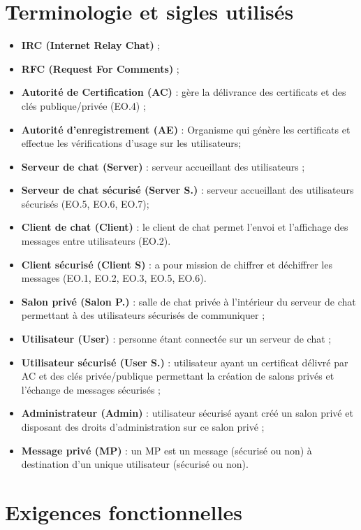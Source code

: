 \documentclass[a4paper,11pt,french]{article}
\begin{document}
\section{Terminologie et sigles utilisés}
\begin{itemize}
\item \textbf{IRC (Internet Relay Chat)} ;
\item \textbf{RFC (Request For Comments)} ;
\item \textbf{Autorité de Certification (AC)} : gère la délivrance des certificats et des clés publique/privée (EO.4) ;
\item \textbf{Autorité d'enregistrement (AE)} : Organisme qui génère les certificats et effectue les vérifications d'usage sur les utilisateurs;
\item \textbf{Serveur de chat (Server)} : serveur accueillant des utilisateurs ;
\item \textbf{Serveur de chat sécurisé (Server S.)} : serveur accueillant des utilisateurs sécurisés (EO.5, EO.6, EO.7);
\item \textbf{Client de chat (Client)} : le client de chat permet l'envoi et l'affichage des messages entre utilisateurs (EO.2).
\item \textbf{Client sécurisé (Client S)} :  a pour mission de chiffrer et déchiffrer les messages (EO.1, EO.2, EO.3, EO.5, EO.6).
\item \textbf{Salon privé (Salon P.)} : salle de chat privée à l'intérieur du serveur de chat permettant à des utilisateurs sécurisés de communiquer ;
\item \textbf{Utilisateur (User)} : personne étant connectée sur un serveur de chat ;
\item \textbf{Utilisateur sécurisé (User S.)} : utilisateur ayant un certificat délivré par AC et des clés privée/publique permettant la création de salons privés et l'échange de messages sécurisés ;
\item \textbf{Administrateur (Admin)} : utilisateur sécurisé ayant créé un salon privé et disposant des droits d'administration sur ce salon privé ;
\item \textbf{Message privé (MP)} : un MP est un message (sécurisé ou non) à destination d'un unique utilisateur (sécurisé ou non).
\end{itemize}

\section{Exigences fonctionnelles}
\end{document}
